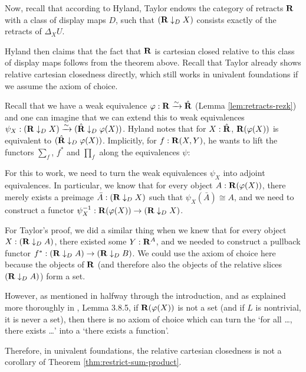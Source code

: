 \begin{remark}
  Now, recall that according to Hyland, Taylor endows the category of retracts $ \mathbf{R} $ with a class of display maps $ D $, such that $ (\mathbf{R} \downarrow_D X) $ consists exactly of the retracts of $ \Delta_X U $.

  Hyland then claims that the fact that $ \mathbf{R} $ is cartesian closed relative to this class of display maps follows from the theorem above. Recall that Taylor already shows relative cartesian closedness directly, which still works in univalent foundations if we assume the axiom of choice.

  Recall that we have a weak equivalence $ \varphi : \mathbf{R} \xrightarrow \sim \hat {\mathbf{R}} $ (Lemma \ref{lem:retracts-rezk}) and one can imagine that we can extend this to weak equivalences $ \psi_X : (\mathbf{R} \downarrow_D X) \xrightarrow \sim (\hat {\mathbf{R}} \downarrow_D \varphi(X)) $. Hyland notes that for $ X : \hat {\mathbf{R}} $, $ \mathbf{R}(\varphi(X)) $ is equivalent to $ (\hat {\mathbf{R}} \downarrow_D \varphi(X)) $. Implicitly, for $ f: \mathbf{R}(X, Y) $, he wants to lift the functors $ \sum_f $, $ f^* $ and $ \prod_f $ along the equivalences $ \psi $:
  \begin{center}
  \end{center}
  For this to work, we need to turn the weak equivalences $ \psi_X $ into adjoint equivalences. In particular, we know that for every object $ A : \mathbf{R}(\varphi(X)) $, there merely exists a preimage $ \bar A : (\mathbf{R} \downarrow_D X) $ such that $ \psi_X(\bar A) \cong A $, and we need to construct a functor $ \psi_X^{-1}: \mathbf{R}(\varphi(X)) \to (\mathbf{R} \downarrow_D X) $.

  For Taylor's proof, we did a similar thing when we knew that for every object $ X : (\mathbf{R} \downarrow_D A) $, there existed some $ Y : \mathbf{R}^A $, and we needed to construct a pullback functor $ f^* : (\mathbf{R} \downarrow_D A) \to (\mathbf{R} \downarrow_D B) $. We could use the axiom of choice here because the objects of $ \mathbf{R} $ (and therefore also the objects of the relative slices $ (\mathbf{R} \downarrow_D A) $) form a set.

  However, as mentioned in \autocite{univalent-categories} halfway through the introduction, and as explained more thoroughly in \autocite{hottbook}, Lemma 3.8.5, if $ \mathbf{R}(\varphi(X)) $ is not a set (and if $ L $ is nontrivial, it is never a set), then there is no axiom of choice which can turn the `for all \dots, there exists \dots' into a `there exists a function'.

  Therefore, in univalent foundations, the relative cartesian closedness is not a corollary of Theorem \ref{thm:restrict-sum-product}.
\end{remark}

